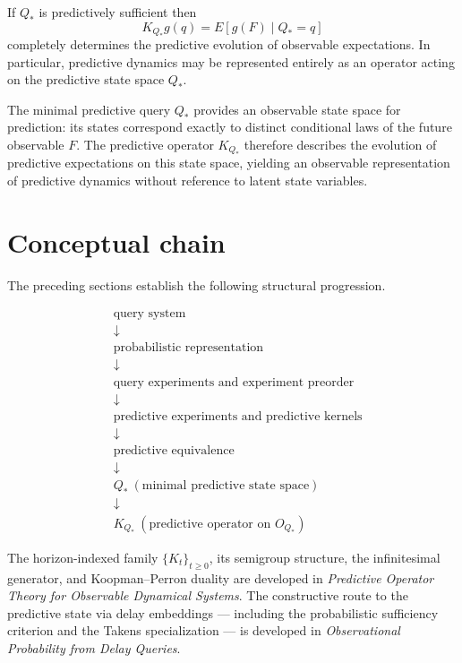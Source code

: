 \begin{corollary}
If $Q_*$ is predictively sufficient then
\[
K_{Q_*}g(q)=E[g(F)\mid Q_*=q]
\]
completely determines the predictive evolution of observable
expectations.
In particular, predictive dynamics may be represented entirely as
an operator acting on the predictive state space $Q_*$.
\end{corollary}

\begin{remark}
The minimal predictive query $Q_*$ provides an observable state space
for prediction: its states correspond exactly to distinct conditional
laws of the future observable $F$.  The predictive operator $K_{Q_*}$
therefore describes the evolution of predictive expectations on this
state space, yielding an observable representation of predictive
dynamics without reference to latent state variables.
\end{remark}


\section{Conceptual chain}

The preceding sections establish the following structural progression.

\[
\begin{aligned}
&\text{query system}\\
&\downarrow\\
&\text{probabilistic representation}\\
&\downarrow\\
&\text{query experiments and experiment preorder}\\
&\downarrow\\
&\text{predictive experiments and predictive kernels}\\
&\downarrow\\
&\text{predictive equivalence}\\
&\downarrow\\
&Q_*\ (\text{minimal predictive state space})\\
&\downarrow\\
&K_{Q_*}\ (\text{predictive operator on }O_{Q_*})
\end{aligned}
\]

\begin{remark}[Continuation]
The horizon-indexed family $\{K_t\}_{t\ge0}$, its semigroup structure,
the infinitesimal generator, and Koopman--Perron duality are developed
in \emph{Predictive Operator Theory for Observable Dynamical Systems}.
The constructive route to the predictive state via delay embeddings ---
including the probabilistic sufficiency criterion and the Takens
specialization --- is developed in \emph{Observational Probability from
Delay Queries}.
\end{remark}

